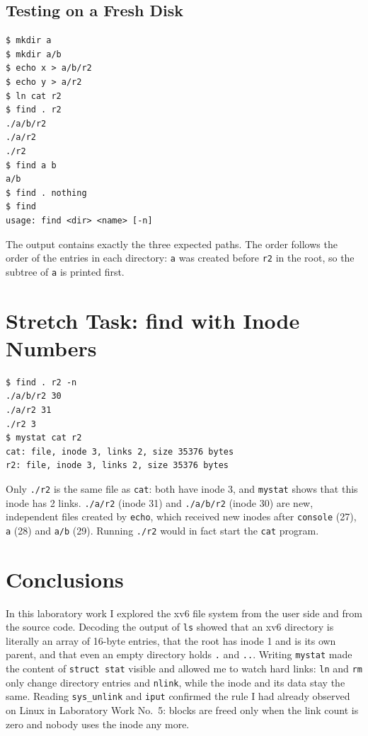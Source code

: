 \documentclass[12pt,a4paper]{article}
\begin{document}
\subsection{Testing on a Fresh Disk}

\begin{lstlisting}[style=terminal,caption={find after make clean ; make qemu}]
$ mkdir a
$ mkdir a/b
$ echo x > a/b/r2
$ echo y > a/r2
$ ln cat r2
$ find . r2
./a/b/r2
./a/r2
./r2
$ find a b
a/b
$ find . nothing
$ find
usage: find <dir> <name> [-n]
\end{lstlisting}

The output contains exactly the three expected paths. The order follows the order of the entries in each directory: \texttt{a} was created before \texttt{r2} in the root, so the subtree of \texttt{a} is printed first.

\newpage
\section{Stretch Task: find with Inode Numbers}

\begin{lstlisting}[style=terminal,caption={find . r2 -n}]
$ find . r2 -n
./a/b/r2 30
./a/r2 31
./r2 3
$ mystat cat r2
cat: file, inode 3, links 2, size 35376 bytes
r2: file, inode 3, links 2, size 35376 bytes
\end{lstlisting}

Only \texttt{./r2} is the same file as \texttt{cat}: both have inode 3, and \texttt{mystat} shows that this inode has 2 links. \texttt{./a/r2} (inode 31) and \texttt{./a/b/r2} (inode 30) are new, independent files created by \texttt{echo}, which received new inodes after \texttt{console} (27), \texttt{a} (28) and \texttt{a/b} (29). Running \texttt{./r2} would in fact start the \texttt{cat} program.

\newpage
\section*{Conclusions}

In this laboratory work I explored the xv6 file system from the user side and from the source code. Decoding the output of \texttt{ls} showed that an xv6 directory is literally an array of 16-byte entries, that the root has inode 1 and is its own parent, and that even an empty directory holds \texttt{.} and \texttt{..}. Writing \texttt{mystat} made the content of \texttt{struct stat} visible and allowed me to watch hard links: \texttt{ln} and \texttt{rm} only change directory entries and \texttt{nlink}, while the inode and its data stay the same. Reading \texttt{sys\_unlink} and \texttt{iput} confirmed the rule I had already observed on Linux in Laboratory Work No.~5: blocks are freed only when the link count is zero and nobody uses the inode any more.
\end{document}
